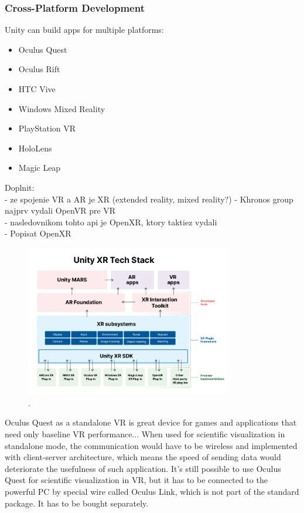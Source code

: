 \subsubsection{Cross-Platform Development}

Unity can build apps for multiple platforms:

\begin{itemize}
	\item Oculus Quest
	\item Oculus Rift
	\item HTC Vive
	\item Windows Mixed Reality
	\item PlayStation VR
	\item HoloLens
	\item Magic Leap
\end{itemize}

Doplnit:\\
- ze spojenie VR a AR je XR (extended reality, mixed reality?)
- Khronos group najprv vydali OpenVR pre VR \\
- nasledovnikom tohto api je OpenXR, ktory taktiez vydali \\
- Popisat OpenXR

\begin{figure}[!ht]
	\centering
	\includegraphics[width=0.8\textwidth]{figures/unity-xr-tech-stack.png}
	\caption{.}
	\label{fig:unity-xr-tech-stack}
\end{figure}

Oculus Quest as a standalone VR is great device for games and applications that need only baseline VR performance... When used for scientific visualization in standalone mode, the communication would have to be wireless and implemented with client-server architecture, which means the speed of sending data would deteriorate the usefulness of such application. It's still possible to use Oculus Quest for scientific visualization in VR, but it has to be connected to the powerful PC by special wire called Oculus Link, which is not part of the standard package. It has to be bought separately.

